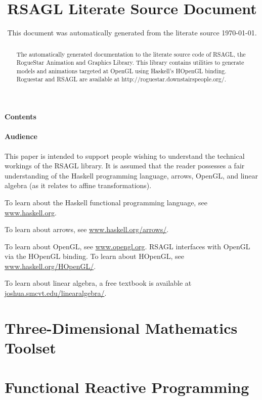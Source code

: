 \documentclass[pdftex]{article}
\title{ RSAGL Literate Source Document }
\date{ This document was automatically generated from the literate source \today. }
\begin{document}
\maketitle

\begin{abstract}
The automatically generated documentation to the literate source code of RSAGL, 
the RogueStar Animation and Graphics Library.  This library contains utilities
to generate models and animations targeted at OpenGL using Haskell's HOpenGL
binding.  Roguestar and RSAGL are available at http://roguestar.downstairspeople.org/.
\end{abstract}

\subsection{Contents}

\tableofcontents

\subsection{Audience}

This paper is intended to support people wishing to understand the technical workings of
the RSAGL library.  It is assumed that the reader possesses a fair understanding
of the Haskell programming language, arrows, OpenGL, and linear algebra (as it relates
to affine transformations).

To learn about the Haskell functional programming language, see 
\href{http://www.haskell.org/}{www.haskell.org}.

To learn about arrows, see 
\href{http://www.haskell.org/arrows/}{www.haskell.org/arrows/}.

To learn about OpenGL, see 
\href{http://www.opengl.org/}{www.opengl.org}.  
RSAGL interfaces with OpenGL via the HOpenGL binding.  To learn about HOpenGL, see 
\href{http://www.haskell.org/HOpenGL/}{www.haskell.org/HOpenGL/}.

To learn about linear algebra, a free textbook is available at 
\href{http://joshua.smcvt.edu/linearalgebra/}{joshua.smcvt.edu/linearalgebra/}.

\part{Three-Dimensional Mathematics Toolset}



\part{Functional Reactive Programming}
\end{document}
